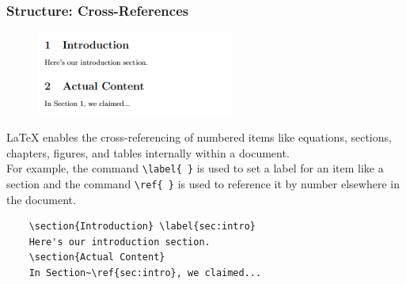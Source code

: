 \begin{frame}[fragile]
\frametitle{Structure: Cross-References}
    \begin{figure}
       \includegraphics[width=0.58\textwidth]{img/crossrefexample.png}
   \end{figure}
   \LaTeX{} enables the cross-referencing of numbered items like equations, sections, chapters, figures, and tables internally within a document. \\
   For example, the command \verb|\label{ }| is used to set a label for an item like a section and the command \verb|\ref{ }| is used to reference it by number elsewhere in the document. 
   \small
   \begin{exampleblock}{}
    \begin{verbatim}
    \section{Introduction} \label{sec:intro}
    Here's our introduction section. 
    \section{Actual Content} 
    In Section~\ref{sec:intro}, we claimed...
    \end{verbatim}
   \end{exampleblock}
\end{frame}






